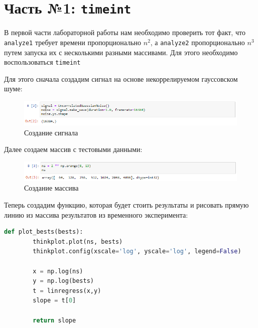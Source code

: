 \documentclass[a4paper]{article}
\begin{document}
    \newpage
        \section{Часть №1: \texttt{timeint}}
            В первой части  лабораторной работы нам необходимо проверить тот факт, что \texttt{analyze1} требует времени пропорционально $n^2$, а \texttt{analyze2} пропорционально $n^3$ путем запуска их с несколькими разными массивами. Для этого необходимо воспользоваться \texttt{timeint}
            
            Для этого сначала создадим сигнал на основе некоррелируемом гауссовском шуме:
            
            \begin{figure}[H]
                \centering
                \includegraphics[width=\textwidth]{ex_1_UGN_signal.png}
                \caption{Создание сигнала}
                \label{fig:ex_1_UGN_signal}
            \end{figure}
            
            Далее создаем массив с тестовыми данными:
            
            \begin{figure}[H]
                \centering
                \includegraphics[width=\textwidth]{ex_1_UGN_array.png}
                \caption{Создание массива}
                \label{fig:ex_1_UGN_array}
            \end{figure}
            
            Теперь создадим функцию, которая будет стоить результаты и рисовать прямую линию из массива результатов из временного эксперимента:
            
\begin{lstlisting}[language=Python, caption= Функция \texttt{plot-bests}]
    def plot_bests(bests):    
        thinkplot.plot(ns, bests)
        thinkplot.config(xscale='log', yscale='log', legend=False)
        
        x = np.log(ns)
        y = np.log(bests)
        t = linregress(x,y)
        slope = t[0]
    
        return slope
\end{lstlisting}
            
\end{document}
